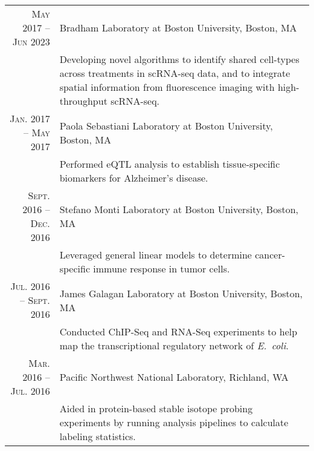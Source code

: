\documentclass[a4paper,10pt]{report}
\begin{document}
\section{\color{linkcolour}{Research}}
\begin{longtable}{rp{10cm}}
	\textsc{May 2017 -- Jun 2023}    & Bradham Laboratory at Boston University, Boston, MA                                           \\
	                                 & \footnotesize{Developing novel algorithms to identify shared cell-types across treatments
		in scRNA-seq data, and to integrate spatial information from fluorescence
	imaging with high-throughput scRNA-seq.}                                                                                         \\
	\textsc{Jan. 2017 -- May 2017}   & Paola Sebastiani Laboratory at Boston University, Boston, MA                                  \\
	                                 & \footnotesize{Performed eQTL analysis to establish tissue-specific biomarkers for
	Alzheimer's disease.}                                                                                                            \\
	\textsc{Sept. 2016 -- Dec. 2016} & Stefano Monti Laboratory at Boston University, Boston, MA                                     \\
	                                 & \footnotesize{Leveraged general linear models to determine cancer-specific immune response in
	tumor cells.}                                                                                                                    \\
	\textsc{Jul. 2016 -- Sept. 2016} & James Galagan Laboratory at Boston University, Boston, MA                                     \\
	                                 & \footnotesize{Conducted ChIP-Seq and RNA-Seq experiments to help map the transcriptional
	regulatory network of \emph{E.\ coli}.}                                                                                          \\
	\textsc{Mar. 2016 -- Jul. 2016}  & Pacific Northwest National Laboratory, Richland, WA                                           \\
	                                 & \footnotesize{Aided in protein-based stable isotope probing experiments by
	running analysis pipelines to  calculate labeling statistics.}                                                                   \\

\end{longtable}
\end{document}
